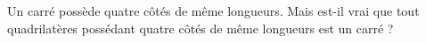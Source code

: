 
\begin{exercice}\label{exosmath-0783}

    Un carré possède quatre côtés de même longueurs. Mais est-il vrai que tout quadrilatères possédant quatre côtés de même longueurs est un carré ?

\end{exercice}
